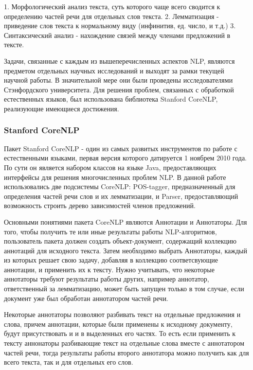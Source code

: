 1. Морфологический анализ текста, суть которого чаще всего сводится к определению
частей речи для отдельных слов текста.
2. Лемматизация - приведение слов текста к нормальному виду (инфинитив, ед. число, и т.д.)
3. Синтаксический анализ - нахождение связей между членами предложений в тексте.

Задачи, связанные с каждым из вышеперечисленных аспектов NLP, 
являются предметом отдельных научных исследований и выходят за рамки текущей научной работы.
В значительной мере они были проведены исследователями Стэнфордского университета. 
Для решения проблем, связанных с обработкой естественных языков, был использована библиотека  Stanford CoreNLP,
реализующие имеющиеся достижения.

\subsubsection{Stanford CoreNLP}
Пакет Stanford CoreNLP\cite{corenlp} - один из самых развитых инструментов по работе 
с естественными языками, первая версия которого датируется 1 ноябрем 2010 года.
По сути он является набором классов на языке Java, предоставляющих интерфейсы
для решения многочисленных проблем NLP. В данной работе использовались две подсистемы CoreNLP:
POS-tagger, предназначенный для определения частей речи слов и их лемматизации,
и Parser, предоставляющий возможность строить дерево зависимостей членов предложений.

Основными понятиями пакета CoreNLP являются Аннотации и Аннотаторы. 
Для того, чтобы получить те или иные результаты работы NLP-алгоритмов,
пользователь пакета должен создать объект-документ,
содержащий коллекцию аннотаций для исходного текста. 
Затем необходимо выбрать Аннотаторы, каждый из которых решает свою задачу, 
добавляя в коллекцию соответсвующие аннотации, и применить их к тексту. 
Нужно учитывать, что некоторые аннотаторы требуют результаты работы других,
например аннотатор, ответственный за лемматизацию, может быть запущен
только в том случае, если документ уже был обработан аннотатором частей речи.

Некоторые аннотаторы позволяют разбивать текст на отдельные предложения и слова,
причем аннотации, которые были применены к исходному документу, будут присутствовать и
и в выделенных его частях. 
То есть если применить к тексту аннонаторы разбивающие текст на отдельные слова
вместе с аннотатором частей речи, тогда результаты работы второго аннотатора
можно получить как для всего текста, так и для отдельных его слов.


